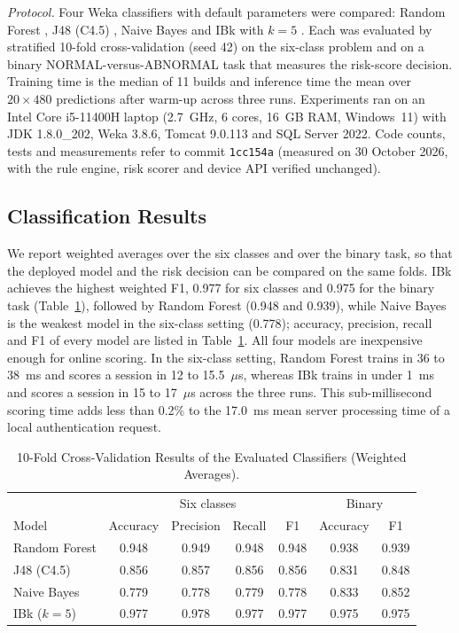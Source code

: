 \documentclass[journal,onecolumn]{IEEEtran}
\newcommand{\measurecommit}{1cc154a}
\begin{document}
\textit{Protocol.} Four Weka classifiers with default parameters were compared: Random Forest \cite{breiman2001rf},
J48 (C4.5) \cite{quinlan1993c45}, Naive Bayes \cite{john1995nb} and IBk with $k = 5$ \cite{aha1991ibl}. Each was
evaluated by stratified 10-fold cross-validation \cite{kohavi1995cv} (seed 42) on the six-class problem and on a binary
NORMAL-versus-ABNORMAL task that measures the risk-score decision. Training time is the median of 11 builds and
inference time the mean over $20 \times 480$ predictions after warm-up across three runs. Experiments ran on an Intel
Core i5-11400H laptop (2.7~GHz, 6 cores, 16~GB RAM, Windows~11) with JDK 1.8.0\_202, Weka 3.8.6, Tomcat 9.0.113 and SQL
Server 2022. Code counts, tests and measurements refer to commit \texttt{\measurecommit} (measured on 30 October 2026,
with the rule engine, risk scorer and device API verified unchanged).

\subsection{Classification Results}

We report weighted averages over the six classes and over the binary task, so that the deployed model and the risk
decision can be compared on the same folds. IBk achieves the highest weighted F1, 0.977 for six classes and 0.975 for
the binary task (Table~\ref{tab:ml}), followed by Random Forest (0.948 and 0.939), while Naive Bayes is the weakest
model in the six-class setting (0.778); accuracy, precision, recall and F1 of every model are listed in
Table~\ref{tab:ml}. All four models are inexpensive enough for online scoring. In the six-class setting, Random Forest
trains in 36 to 38~ms and scores a session in 12 to 15.5~$\mu$s, whereas IBk trains in under 1~ms and scores a session
in 15 to 17~$\mu$s across the three runs. This sub-millisecond scoring time adds less than 0.2\% to the 17.0~ms mean
server processing time of a local authentication request.

\begin{table}[!htbp]
\renewcommand{\arraystretch}{1.02}
\centering
\small
\caption{10-Fold Cross-Validation Results of the Evaluated Classifiers (Weighted Averages).}
\label{tab:ml}
\vspace{5pt}
\begin{tabular}{l c c c c c c}
\hline
 & \multicolumn{4}{c}{Six classes} & \multicolumn{2}{c}{Binary} \\
Model & Accuracy & Precision & Recall & F1 & Accuracy & F1 \\
\hline
Random Forest & 0.948 & 0.949 & 0.948 & 0.948 & 0.938 & 0.939 \\
J48 (C4.5)    & 0.856 & 0.857 & 0.856 & 0.856 & 0.831 & 0.848 \\
Naive Bayes   & 0.779 & 0.778 & 0.779 & 0.778 & 0.833 & 0.852 \\
IBk ($k=5$)   & 0.977 & 0.978 & 0.977 & 0.977 & 0.975 & 0.975 \\
\hline
\end{tabular}
\end{table}
\end{document}
